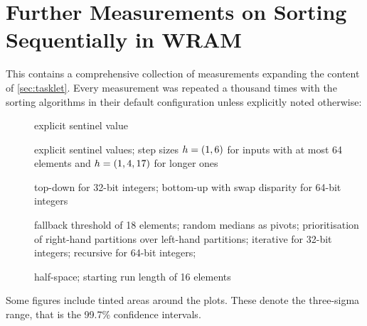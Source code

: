 \chapter{Further Measurements on Sorting Sequentially in WRAM}
\label{apx:tasklet}

This  contains a comprehensive collection of measurements expanding the content of \cref{sec:tasklet}.
Every measurement was repeated a thousand times with the sorting algorithms in their default configuration unless explicitly noted otherwise:
\begin{description}
	\item[\IS{}]
	explicit sentinel value

	\item[\ShS{}]
	explicit sentinel values;
	step sizes \(h = (1, 6)\) for inputs with at most 64 elements and \(h = (1, 4, 17)\) for longer ones

	\item[\HS{}]
	top-down for 32-bit integers;
	bottom-up with swap disparity for 64-bit integers

	\item[\QS{}]
	fallback threshold of 18 elements;
	random medians as pivots;
	prioritisation of right-hand partitions over left-hand partitions;
	iterative for 32-bit integers;
	recursive for 64-bit integers;

	\item[\MS{}]
	half-space;
	starting run length of 16 elements
\end{description}
Some figures include tinted areas around the plots.
These denote the three-sigma range, that is the 99.7\% confidence intervals.










